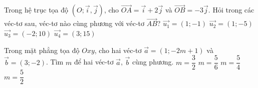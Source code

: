 \begin{ex}%
	Trong hệ trục tọa độ $(O; \vec{i}, \vec{j})$, cho $\vec{OA}=\vec{i}+2\vec{j}$ và $\vec{OB}=-3\vec{j}$. Hỏi trong các véc-tơ sau, véc-tơ nào cùng phương với véc-tơ $\vec{AB}$?
	\choice
	{$\vec{u_1}=(1;-1)$}
	{$\vec{u_2}=(1;-5)$}
	{$\vec{u_3}=(-2;10)$}
	{\True $\vec{u_4}=(3;15)$}
\end{ex}

\begin{ex}%
	Trong mặt phẳng tọa độ $Oxy$, cho hai véc-tơ $\vec{a}=(1;-2m+1)$ và $\vec{b}=(3;-2)$. Tìm $m$ để hai véc-tơ $\vec{a}$, $\vec{b}$ cùng phương.
	\choice
	{$m=\dfrac{3}{2}$}
	{\True $m=\dfrac{5}{6}$}
	{$m=\dfrac{5}{4}$}
	{$m=\dfrac{5}{2}$}
\end{ex}



